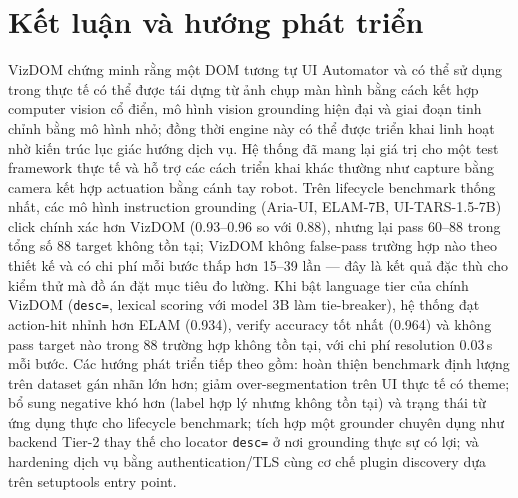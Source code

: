 \documentclass[11pt,a4paper]{article}
\newcommand{\code}[1]{\texttt{#1}}
\begin{document}
\section{Kết luận và hướng phát triển}
VizDOM chứng minh rằng một DOM tương tự UI Automator và có thể sử dụng trong thực tế
có thể được tái dựng từ ảnh chụp màn hình bằng cách kết hợp computer vision cổ điển,
mô hình vision grounding hiện đại và giai đoạn tinh chỉnh bằng mô hình nhỏ; đồng
thời engine này có thể được triển khai linh hoạt nhờ kiến trúc lục giác hướng dịch
vụ. Hệ thống đã mang lại giá trị cho một test framework thực tế và hỗ trợ các cách
triển khai khác thường như capture bằng camera kết hợp actuation bằng cánh tay robot.
Trên lifecycle benchmark thống nhất, các mô hình instruction grounding (Aria-UI,
ELAM-7B, UI-TARS-1.5-7B) click chính xác hơn VizDOM (0.93--0.96 so với 0.88), nhưng
lại pass 60--88 trong tổng số 88 target không tồn tại; VizDOM không false-pass trường
hợp nào theo thiết kế và có chi phí mỗi bước thấp hơn 15--39 lần --- đây là kết quả
đặc thù cho kiểm thử mà đồ án đặt mục tiêu đo lường. Khi bật language tier của chính
VizDOM (\code{desc=}, lexical scoring với model 3B làm tie-breaker), hệ thống đạt
action-hit nhỉnh hơn ELAM (0.934), verify accuracy tốt nhất (0.964) và không pass
target nào trong 88 trường hợp không tồn tại, với chi phí resolution 0.03\,s mỗi bước. Các hướng
phát triển tiếp theo
gồm: hoàn thiện benchmark định lượng trên dataset gán nhãn lớn hơn; giảm
over-segmentation trên UI thực tế có theme; bổ sung negative khó hơn (label hợp lý
nhưng không tồn tại) và trạng thái từ ứng dụng thực cho lifecycle benchmark; tích hợp
một grounder chuyên dụng như backend Tier-2 thay thế cho locator \code{desc=} ở nơi
grounding thực sự có lợi; và hardening dịch vụ bằng authentication/TLS cùng cơ chế
plugin discovery dựa trên setuptools entry point.



\end{document}
